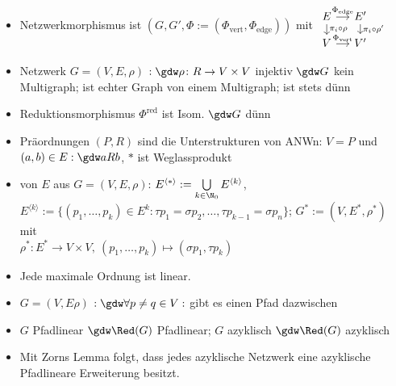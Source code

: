 \begin{itemize}
		\item Netzwerkmorphismus ist $(G,G',\Phi:=(\Phi_{\text{vert}},\Phi_{\text{edge}}))$ mit
		$\begin{tikzcd}[column sep=small, row sep=small]
        E \dar{\pi_i \circ \rho} \rar{\Phi_{\text{edge}}} & E' \dar{\pi_i \circ \rho'}\\
        V \rar{\Phi_{\text{vert}}} & V' 
    \end{tikzcd}$
	    \item Netzwerk $G=(V,E,\rho)$  $:\gdw\rho\colon R\to V\times V$ injektiv $\gdw G$ kein Multigraph;  ist echter Graph von einem Multigraph; ist stets dünn
	    \item Reduktionsmorphismus $\Phi^{\text{red}}$ ist Isom. $\gdw G$ dünn
		\item Präordnungen $(P,R)$ sind die Unterstrukturen von ANWn: $V=P$ und $(a,b)\in E:\gdw aRb$, $\ast$ ist Weglassprodukt	    
	    \item {} von $E$ aus $G=(V,E,\rho)$:
	    $E^{\langle\ast\rangle}:=\bigcup\limits_{k\in\N_0} E^{\langle k\rangle}$,\\
	    $E^{\langle k\rangle}:=\lbrace(p_1,\ldots,p_k)\in E^k:\tau p_1=\sigma p_2,\ldots,\tau p_{k-1}=\sigma p_n\rbrace$; 
	    $G^\ast:=(V,E^\ast,\rho^\ast)$ mit\\ $\rho^\ast\colon E^\ast\to V\times V,~(p_1,\ldots,p_k)\mapsto(\sigma p_1,\tau p_k)$
	    \item Jede maximale Ordnung ist linear.
	    \item $G=(V,E\rho)$  $:\gdw\forall p\neq q\in V:$ gibt es einen Pfad dazwischen
	    
	    \item $G$ Pfadlinear $\gdw\Red(G)$ Pfadlinear; $G$ azyklisch $\gdw\Red(G)$ azyklisch
	    \item Mit Zorns Lemma folgt, dass jedes azyklische Netzwerk eine azyklische Pfadlineare Erweiterung besitzt.

	\end{itemize}
	
